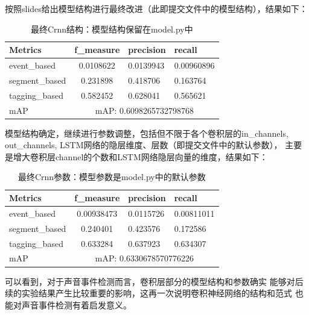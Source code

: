 \documentclass[]{ctexart}
\begin{document}
\newpage
按照slides给出模型结构进行最终改进（此即提交文件中的模型结构），结果如下：
\begin{table}[ht]
    \centering
    \begin{tabular}{|l|cll|}
    \hline
    Metrics        & \multicolumn{1}{c|}{f\_measure} & \multicolumn{1}{l|}{precision}  & recall     \\ \hline
    event\_based   & \multicolumn{1}{c|}{0.0108622}  & \multicolumn{1}{l|}{0.0139943}  & 0.00960896 \\ \hline
    segment\_based & \multicolumn{1}{c|}{0.231898}   & \multicolumn{1}{l|}{0.418706}   & 0.163764   \\ \hline
    tagging\_based & \multicolumn{1}{c|}{0.582452}   & \multicolumn{1}{l|}{0.628041}   & 0.565621   \\ \hline
    mAP            & \multicolumn{3}{c|}{mAP: 0.6098265732798768}                                        \\ \hline
    \end{tabular}
    \caption{最终Crnn结构：模型结构保留在model.py中}
    \label{exp3}
\end{table}

模型结构确定，继续进行参数调整，包括但不限于各个卷积层的in\_channels, out\_channels, LSTM网络的隐层维度、层数（即提交文件中的默认参数），
主要是增大卷积层channel的个数和LSTM网络隐层向量的维度，结果如下：
\begin{table}[ht]
    \centering
    \begin{tabular}{|l|cll|}
    \hline
    Metrics        & \multicolumn{1}{c|}{f\_measure} & \multicolumn{1}{l|}{precision}  & recall     \\ \hline
    event\_based   & \multicolumn{1}{c|}{0.00938473} & \multicolumn{1}{l|}{0.0115726}  & 0.00811011 \\ \hline
    segment\_based & \multicolumn{1}{c|}{0.240401}   & \multicolumn{1}{l|}{0.423576}   & 0.172586   \\ \hline
    tagging\_based & \multicolumn{1}{c|}{0.633284}   & \multicolumn{1}{l|}{0.637923}   & 0.634307   \\ \hline
    mAP            & \multicolumn{3}{c|}{mAP: 0.6330678570776226}                                        \\ \hline
    \end{tabular}
    \caption{最终Crnn参数：模型参数是model.py中的默认参数}
    \label{exp4}
\end{table}

可以看到，对于声音事件检测而言，卷积层部分的模型结构和参数确实
能够对后续的实验结果产生比较重要的影响，这再一次说明卷积神经网络的结构和范式
也能对声音事件检测有着启发意义。
\end{document}
